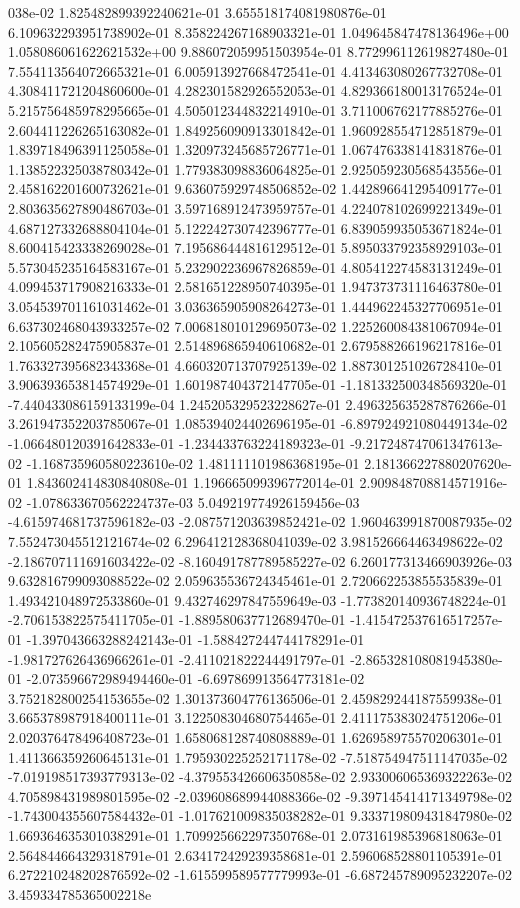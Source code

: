 038e-02	1.825482899392240621e-01	3.655518174081980876e-01	6.109632293951738902e-01	8.358224267168903321e-01	1.049645847478136496e+00	1.058086061622621532e+00	9.886072059951503954e-01	8.772996112619827480e-01	7.554113564072665321e-01	6.005913927668472541e-01	4.413463080267732708e-01	4.308411721204860600e-01	4.282301582926552053e-01	4.829366180013176524e-01	5.215756485978295665e-01	4.505012344832214910e-01	3.711006762177885276e-01	2.604411226265163082e-01	1.849256090913301842e-01	1.960928554712851879e-01	1.839718496391125058e-01	1.320973245685726771e-01	1.067476338141831876e-01	1.138522325038780342e-01	1.779383098836064825e-01	2.925059230568543556e-01	2.458162201600732621e-01	9.636075929748506852e-02	1.442896641295409177e-01	2.803635627890486703e-01	3.597168912473959757e-01	4.224078102699221349e-01	4.687127332688804104e-01	5.122242730742396777e-01	6.839059935053671824e-01	8.600415423338269028e-01	7.195686444816129512e-01	5.895033792358929103e-01	5.573045235164583167e-01	5.232902236967826859e-01	4.805412274583131249e-01	4.099453717908216333e-01	2.581651228950740395e-01	1.947373731116463780e-01	3.054539701161031462e-01	3.036365905908264273e-01	1.444962245327706951e-01	6.637302468043933257e-02	7.006818010129695073e-02	1.225260084381067094e-01	2.105605282475905837e-01	2.514896865940610682e-01	2.679588266196217816e-01	1.763327395682343368e-01	4.660320713707925139e-02	1.887301251026728410e-01	3.906393653814574929e-01	1.601987404372147705e-01	-1.181332500348569320e-01	-7.440433086159133199e-04	1.245205329523228627e-01	2.496325635287876266e-01	3.261947352203785067e-01	1.085394024402696195e-01	-6.897924921080449134e-02	-1.066480120391642833e-01	-1.234433763224189323e-01	-9.217248747061347613e-02	-1.168735960580223610e-02	1.481111101986368195e-01	2.181366227880207620e-01	1.843602414830840808e-01	1.196665099396772014e-01	2.909848708814571916e-02	-1.078633670562224737e-03	5.049219774926159456e-03	-4.615974681737596182e-03	-2.087571203639852421e-02	1.960463991870087935e-02	7.552473045512121674e-02	6.296412128368041039e-02	3.981526664463498622e-02	-2.186707111691603422e-02	-8.160491787789585227e-02	6.260177313466903926e-03	9.632816799093088522e-02	2.059635536724345461e-01	2.720662253855535839e-01	1.493421048972533860e-01	9.432746297847559649e-03	-1.773820140936748224e-01	-2.706153822575411705e-01	-1.889580637712689470e-01	-1.415472537616517257e-01	-1.397043663288242143e-01	-1.588427244744178291e-01	-1.981727626436966261e-01	-2.411021822244491797e-01	-2.865328108081945380e-01	-2.073596672989494460e-01	-6.697869913564773181e-02	3.752182800254153655e-02	1.301373604776136506e-01	2.459829244187559938e-01	3.665378987918400111e-01	3.122508304680754465e-01	2.411175383024751206e-01	2.020376478496408723e-01	1.658068128740808889e-01	1.626958975570206301e-01	1.411366359260645131e-01	1.795930225252171178e-02	-7.518754947511147035e-02	-7.019198517393779313e-02	-4.379553426606350858e-02	2.933006065369322263e-02	4.705898431989801595e-02	-2.039608689944088366e-02	-9.397145414171349798e-02	-1.743004355607584432e-01	-1.017621009835038282e-01	9.333719809431847980e-02	1.669364635301038291e-01	1.709925662297350768e-01	2.073161985396818063e-01	2.564844664329318791e-01	2.634172429239358681e-01	2.596068528801105391e-01	6.272210248202876592e-02	-1.615599589577779993e-01	-6.687245789095232207e-02	3.459334785365002218e